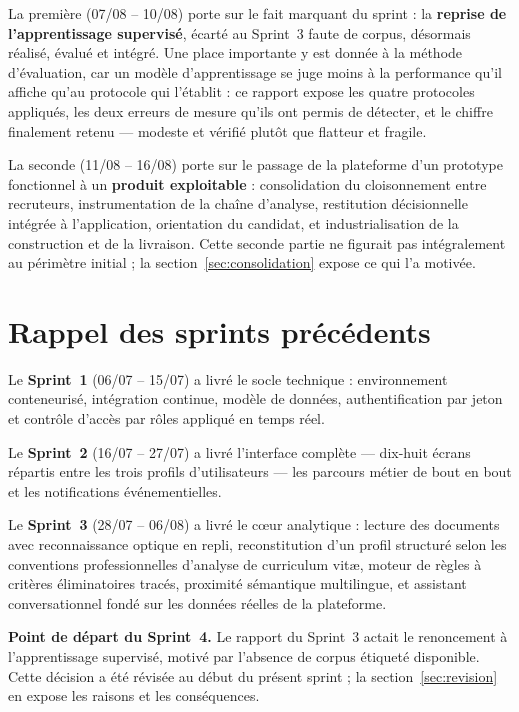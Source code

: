 \documentclass[11pt,a4paper]{article}
\begin{document}
La première (07/08 -- 10/08) porte sur le fait marquant du sprint : la \textbf{reprise de l'apprentissage supervisé}, écarté au Sprint~3 faute de corpus, désormais réalisé, évalué et intégré. Une place importante y est donnée à la méthode d'évaluation, car un modèle d'apprentissage se juge moins à la performance qu'il affiche qu'au protocole qui l'établit : ce rapport expose les quatre protocoles appliqués, les deux erreurs de mesure qu'ils ont permis de détecter, et le chiffre finalement retenu --- modeste et vérifié plutôt que flatteur et fragile.

La seconde (11/08 -- 16/08) porte sur le passage de la plateforme d'un prototype fonctionnel à un \textbf{produit exploitable} : consolidation du cloisonnement entre recruteurs, instrumentation de la chaîne d'analyse, restitution décisionnelle intégrée à l'application, orientation du candidat, et industrialisation de la construction et de la livraison. Cette seconde partie ne figurait pas intégralement au périmètre initial ; la section~\ref{sec:consolidation} expose ce qui l'a motivée.

\section{Rappel des sprints précédents}
Le \textbf{Sprint~1} (06/07 -- 15/07) a livré le socle technique : environnement conteneurisé, intégration continue, modèle de données, authentification par jeton et contrôle d'accès par rôles appliqué en temps réel.

Le \textbf{Sprint~2} (16/07 -- 27/07) a livré l'interface complète — dix-huit écrans répartis entre les trois profils d'utilisateurs — les parcours métier de bout en bout et les notifications événementielles.

Le \textbf{Sprint~3} (28/07 -- 06/08) a livré le cœur analytique : lecture des documents avec reconnaissance optique en repli, reconstitution d'un profil structuré selon les conventions professionnelles d'analyse de curriculum vitæ, moteur de règles à critères éliminatoires tracés, proximité sémantique multilingue, et assistant conversationnel fondé sur les données réelles de la plateforme.

\medskip
\noindent\textbf{Point de départ du Sprint~4.} Le rapport du Sprint~3 actait le renoncement à l'apprentissage supervisé, motivé par l'absence de corpus étiqueté disponible. Cette décision a été révisée au début du présent sprint ; la section~\ref{sec:revision} en expose les raisons et les conséquences.
\end{document}
